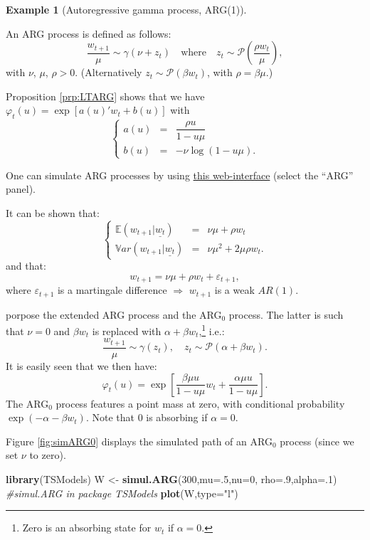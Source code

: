 \documentclass[
  12pt,
]{book}
\newenvironment{Shaded}{\begin{snugshade}}{\end{snugshade}}
\newcommand{\AttributeTok}[1]{\textcolor[rgb]{0.13,0.29,0.53}{#1}}
\newcommand{\CommentTok}[1]{\textcolor[rgb]{0.56,0.35,0.01}{\textit{#1}}}
\newcommand{\DecValTok}[1]{\textcolor[rgb]{0.00,0.00,0.81}{#1}}
\newcommand{\FunctionTok}[1]{\textcolor[rgb]{0.13,0.29,0.53}{\textbf{#1}}}
\newcommand{\NormalTok}[1]{#1}
\newcommand{\OtherTok}[1]{\textcolor[rgb]{0.56,0.35,0.01}{#1}}
\newcommand{\StringTok}[1]{\textcolor[rgb]{0.31,0.60,0.02}{#1}}
\theoremstyle{definition}
\theoremstyle{definition}
\newtheorem{example}{Example}[chapter]
\theoremstyle{definition}
\theoremstyle{definition}
\theoremstyle{remark}
\begin{document}
\begin{example}[Autoregressive gamma process, ARG(1)]
\protect\hypertarget{exm:ARG1}{}\label{exm:ARG1}

An ARG process is defined as follows:
\[
\frac{w_{t+1}}{\mu} \sim \gamma(\nu+z_t) \quad \mbox{where} \quad z_t \sim \mathcal{P} \left( \frac{\rho w_t}{\mu} \right),
\]
with \(\nu\), \(\mu\), \(\rho > 0\). (Alternatively \(z_t \sim {\mathcal{P}}(\beta w_t)\), with \(\rho = \beta \mu\).)

Proposition \ref{prp:LTARG} shows that we have \(\varphi_t(u) = \exp[a(u)'w_t+b(u)]\) with
\[
\left\{
\begin{array}{cll}
a(u) &=&  \dfrac{\rho u}{1-u \mu}\\
b(u) &=& -\nu  
\log(1-u \mu).
\end{array}
\right.
\]

One can simulate ARG processes by using \href{https://jrenne.shinyapps.io/Affine/}{this web-interface} (select the ``ARG'' panel).

It can be shown that:
\[
\left\{
\begin{array}{cll}
\mathbb{E}(w_{t+1}|\underline{w_t}) &=& \nu \mu + \rho w_t \\
\mathbb{V}ar(w_{t+1}|\underline{w_t}) &=& \nu \mu^2 + 2 \mu \rho w_t.
\end{array}
\right.
\]
and that:
\[
w_{t+1}=\nu\mu+\rho w_t+\varepsilon_{t+1},
\]
where \(\varepsilon_{t+1}\) is a martingale difference \(\Rightarrow\) \(w_{t+1}\) is a weak \(AR(1)\).

\citet{zarg_2017} porpose the extended ARG process and the ARG\(_0\) process. The latter is such that \(\nu = 0\) and \(\beta w_t\) is replaced with \(\alpha + \beta w_t\),\footnote{Zero is an absorbing state for \(w_t\) if \(\alpha = 0\).} i.e.:
\begin{equation}
\frac{w_{t+1}}{\mu} \sim \gamma(z_t),\quad z_t \sim {\mathcal{P}}(\alpha + \beta w_t).\label{eq:ARG0}
\end{equation}
It is easily seen that we then have:
\[
\varphi_t(u) = \exp \left[\frac{\beta \mu u}{1-u \mu} w_t + \frac{\alpha \mu u}{1-u \mu}
\right].
\]
The ARG\(_0\) process features a point mass at zero, with conditional probability \(\exp(-\alpha - \beta w_t)\). Note that 0 is absorbing if \(\alpha = 0\).

Figure \ref{fig:simARG0} displays the simulated path of an ARG\(_0\) process (since we set \(\nu\) to zero).

\begin{Shaded}
\begin{Highlighting}[]
\FunctionTok{library}\NormalTok{(TSModels)}
\NormalTok{W }\OtherTok{\textless{}{-}} \FunctionTok{simul.ARG}\NormalTok{(}\DecValTok{300}\NormalTok{,}\AttributeTok{mu=}\NormalTok{.}\DecValTok{5}\NormalTok{,}\AttributeTok{nu=}\DecValTok{0}\NormalTok{,}
               \AttributeTok{rho=}\NormalTok{.}\DecValTok{9}\NormalTok{,}\AttributeTok{alpha=}\NormalTok{.}\DecValTok{1}\NormalTok{) }\CommentTok{\#simul.ARG in package TSModels}
\FunctionTok{plot}\NormalTok{(W,}\AttributeTok{type=}\StringTok{"l"}\NormalTok{)}
\end{Highlighting}
\end{Shaded}


\end{example}
\end{document}
